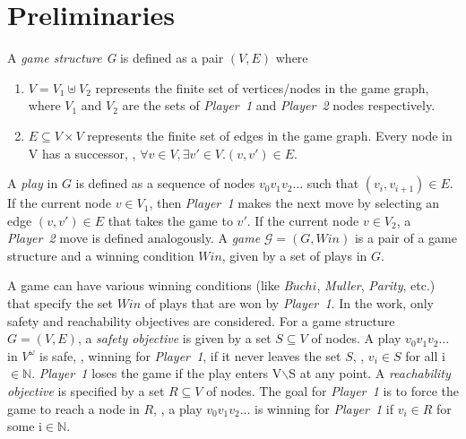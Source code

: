 \chapter{Preliminaries}
\label{Sec:Preliminaries}
A \textit{game structure} \textit{G} is defined as a pair $(V, E)$ where
\begin{enumerate}
	\item $V = V_{1} \uplus V_{2}$ represents the finite set of vertices/nodes in the game graph, where $V_{1}$ and $V_{2}$ are the sets of \textit{Player~1} and \textit{Player~2} nodes respectively.
	\item $E\subseteq V \times V$ represents the finite set of edges in the game graph. Every node in V has a successor, \ie, $\forall v \in V, \exists v' \in V . (v,v') \in E$.
\end{enumerate}

A \textit{play} in $G$ is defined as a sequence of nodes $v_{0} v_{1}
v_{2} \ldots$ such that $(v_{i},v_{i+1}) \in E$. If the current node
$v \in V_{1}$, then \textit{Player~1} makes the next move by selecting
an edge $(v,v') \in E$ that takes the game to $v'$. If the current
node $v \in V_{2}$, a \textit{Player~2} move is defined analogously. A
\textit{game} $\mathcal{G} = (G,\mathit{Win})$ is a pair of a game structure
and a winning condition $\mathit{Win}$, given by a set of plays in $G$.

A game can have various winning conditions (like
\textit{B$\ddot{u}chi$}, \textit{Muller}, \textit{Parity}, etc.) that
specify the set $\mathit{\mathit{Win}}$ of plays that are won by
\textit{Player~1}. In the work, only safety and
reachability objectives are considered. For a game structure $G = (V,E)$, a
\textit{safety objective} is given by a set $S \subseteq V$ of
nodes. A play $v_{0}v_{1}v_{2}\ldots$ in $V^{\omega}$ is safe,
\ie, winning for \textit{Player~1}, if it never leaves the set $S$,
\ie, $v_{i} \in S$ for all i$\in \mathbb{N}$. \textit{Player~1} loses
the game if the play enters V$\backslash$S at any point.  A
\textit{reachability objective} is specified by a set $R \subseteq V$
of nodes. The goal for \textit{Player~1} is to force the game to reach
a node in $R$, \ie, a play $v_{0}v_{1}v_{2}\ldots$ is winning
for \textit{Player~1} if $v_{i} \in R$ for some i$\in \mathbb{N}$.

